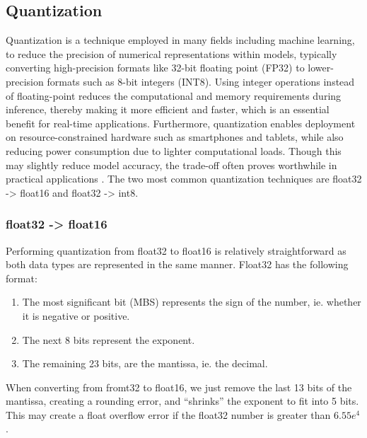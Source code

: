 \documentclass[licencjacka,en]{pracamgr}
\begin{document}
\subsection{Quantization}
Quantization is a technique employed in many fields including machine learning, to reduce the precision of numerical representations within models, typically converting high-precision formats like 32-bit floating point (FP32) to lower-precision formats such as 8-bit integers (INT8). Using integer operations instead of floating-point reduces the computational and memory requirements during inference, thereby making it more efficient and faster, which is an essential benefit for real-time applications. Furthermore, quantization enables deployment on resource-constrained hardware such as smartphones and tablets, while also reducing power consumption due to lighter computational loads. Though this may slightly reduce model accuracy, the trade-off often proves worthwhile in practical applications \cite{ibm_quantization}.
The two most common quantization techniques are float32 -> float16 and float32 -> int8.
\subsubsection{float32 -> float16}
Performing quantization from float32 to float16 is relatively straightforward as both data types are represented in the same manner. Float32 has the following format: 
\begin{enumerate}
	\item The most significant bit (MBS) represents the sign of the number, ie. whether it is negative or positive.
	\item The next 8 bits represent the exponent.
	\item The remaining 23 bits, are the mantissa, ie. the decimal.
\end{enumerate}

When converting from fromt32 to float16, we just remove the last 13 bits of the mantissa, creating a rounding error, and “shrinks” the exponent to fit into 5 bits. This may create a float overflow error if the float32 number is greater than $ 6.55e^4$ \cite{quant_explained}. 
\end{document}
